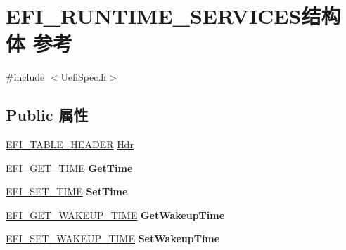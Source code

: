 \hypertarget{struct_e_f_i___r_u_n_t_i_m_e___s_e_r_v_i_c_e_s}{}\section{E\+F\+I\+\_\+\+R\+U\+N\+T\+I\+M\+E\+\_\+\+S\+E\+R\+V\+I\+C\+E\+S结构体 参考}
\label{struct_e_f_i___r_u_n_t_i_m_e___s_e_r_v_i_c_e_s}


{\ttfamily \#include $<$Uefi\+Spec.\+h$>$}

\subsection*{Public 属性}
\begin{DoxyCompactItemize}
\item 
\hyperlink{struct_e_f_i___t_a_b_l_e___h_e_a_d_e_r}{E\+F\+I\+\_\+\+T\+A\+B\+L\+E\+\_\+\+H\+E\+A\+D\+ER} \hyperlink{struct_e_f_i___r_u_n_t_i_m_e___s_e_r_v_i_c_e_s_a25fb50638399044ec29eccc4e54cb29e}{Hdr}
\item 
\mbox{\label{struct_e_f_i___r_u_n_t_i_m_e___s_e_r_v_i_c_e_s_a2d679c3107f22d85b6e086901fb938bc}} 
\hyperlink{_uefi_spec_8h_abf6eb46e27b07dfe1e9920806397ba03}{E\+F\+I\+\_\+\+G\+E\+T\+\_\+\+T\+I\+ME} {\bfseries Get\+Time}
\item 
\mbox{\label{struct_e_f_i___r_u_n_t_i_m_e___s_e_r_v_i_c_e_s_aca84bcd02e98eddb22cf97d608aa3d6f}} 
\hyperlink{_uefi_spec_8h_a63632f4d029627e25f33b77a11ef4155}{E\+F\+I\+\_\+\+S\+E\+T\+\_\+\+T\+I\+ME} {\bfseries Set\+Time}
\item 
\mbox{\label{struct_e_f_i___r_u_n_t_i_m_e___s_e_r_v_i_c_e_s_a736eabafd3693faa67f56576fa2a924e}} 
\hyperlink{_uefi_spec_8h_ae35a1e705a27dd772665f0c39d5ab017}{E\+F\+I\+\_\+\+G\+E\+T\+\_\+\+W\+A\+K\+E\+U\+P\+\_\+\+T\+I\+ME} {\bfseries Get\+Wakeup\+Time}
\item 
\mbox{\label{struct_e_f_i___r_u_n_t_i_m_e___s_e_r_v_i_c_e_s_a53a5bf02aa33796d70aa3261967f7ae4}} 
\hyperlink{_uefi_spec_8h_acf41170aa6f314aaadd5f82a33ab64b7}{E\+F\+I\+\_\+\+S\+E\+T\+\_\+\+W\+A\+K\+E\+U\+P\+\_\+\+T\+I\+ME} {\bfseries Set\+Wakeup\+Time}

\end{DoxyCompactItemize}
